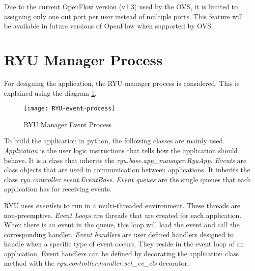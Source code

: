 Due to the current OpenFlow version (v1.3) used by the OVS, it is limited to assigning only one out port per user instead of multiple ports. This feature will be available in future versions of OpenFlow when supported by OVS.

\section{RYU Manager Process \cite{RYU_app_process}} \label{RYU_Manager_Process}
 For designing the application, the RYU manager process is considered. This is explained using the diagram \ref{fig:RYU-Event-Process}.
 \begin{figure}
 	\centering
 	\texttt{[image: RYU-event-process]}
 	\caption {RYU Manager Event Process \cite{RYU_event_process_diag}}
 	\label{fig:RYU-Event-Process}
 	\vspace{-10pt}
 \end{figure}
To build the application in python, the following classes are mainly used. \textit{Application} is the user logic instructions that tells how the application should behave. It is a class that inherits the \textit{ryu.base.app\_manager.RyuApp}. \textit{Events} are class objects that are used in communication between applications. It inherits the class \textit{ryu.controller.event.EventBase}. \textit{Event queues} are the single queues that each application has for receiving events. 

RYU uses \textit{eventlets} to run in a multi-threaded environment. These threads are non-preemptive. \textit{Event Loops} are threads that are created for each application. When there is an event in the queue, this loop will load the event and call the corresponding handler.  \textit{Event handlers} are user defined handlers designed to handle when a specific type of event occurs. They reside in the event loop of an application. Event handlers can be defined by decorating the application class method with the \textit{ryu.controller.handler.set\_ev\_cls} decorator.

